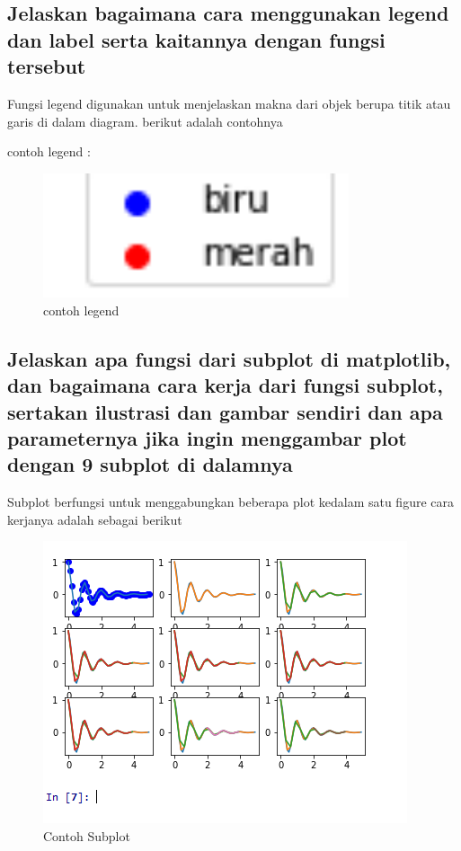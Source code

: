 \subsection{Jelaskan bagaimana cara menggunakan legend dan label serta kaitannya dengan fungsi tersebut}
Fungsi legend digunakan untuk menjelaskan makna dari objek berupa titik atau garis di dalam diagram.
berikut adalah contohnya 

contoh legend :
\begin{figure}[H]
    \includegraphics[width=9cm]{figures/6/Teori/1174051/6.png}
    \caption{contoh legend}
    \centering
\end{figure}

\subsection{Jelaskan apa fungsi dari subplot di matplotlib, dan bagaimana cara kerja dari fungsi subplot, sertakan ilustrasi dan gambar sendiri dan apa parameternya jika ingin menggambar plot dengan 9 subplot di dalamnya}
Subplot berfungsi untuk menggabungkan beberapa plot kedalam satu figure
cara kerjanya adalah sebagai berikut


\begin{figure}[h]
\centering
\includegraphics[scale=0.7]{figures/6/Teori/1174051/subplot.png}
\caption{Contoh Subplot}
\label{fig:contoh subplot}
\end{figure}

